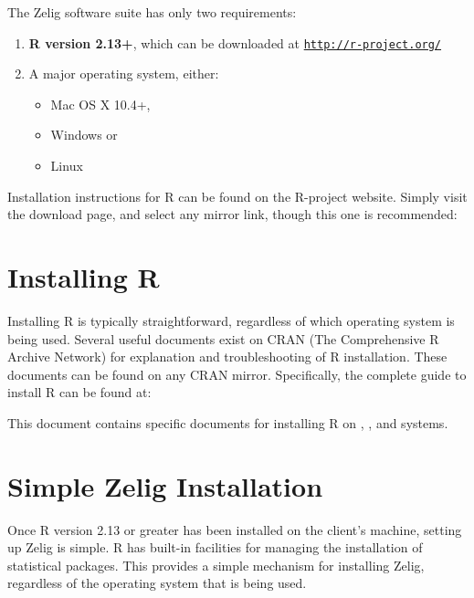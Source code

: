 The Zelig software suite has only two requirements: 

\begin{enumerate}

  \item {\bf R version 2.13+}, which can be downloaded at \href{http://www.r-project.org/}{\tt http://r-project.org/}

  \item A major operating system, either:

    \begin{itemize}
      \item Mac OS X 10.4+,
      \item Windows or
      \item Linux
    \end{itemize}

\end{enumerate}

Installation instructions for R can be found on the R-project website. Simply
visit the download page, and select any mirror link, though this one is
recommended:

\CranMirror



\section{Installing R}

Installing R is typically straightforward, regardless of which operating
system is being used. Several useful documents exist on CRAN
(The Comprehensive R Archive Network) for explanation and troubleshooting of R
installation. These documents can be found on any CRAN mirror. Specifically,
the complete guide to install R can be found at:

\InstallInstructionsHref

This document contains specific documents for installing R on \MacInstallHref,
\WindowsInstallHref, and \UnixInstallHref systems.



\section{Simple Zelig Installation}

Once R version 2.13 or greater has been installed on the client's machine,
setting up Zelig is simple. R has built-in facilities for managing the
installation of statistical packages. This provides a simple mechanism for
installing Zelig, regardless of the operating system that is being used.


